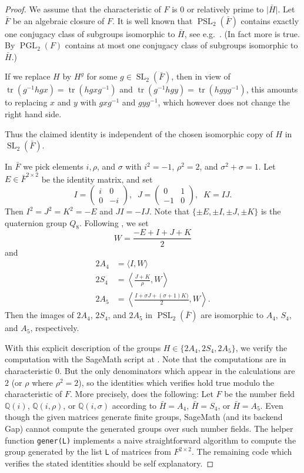 \documentclass[12pt]{amsart}
\theoremstyle{plain}
\theoremstyle{definition}
\numberwithin{equation}{section}
\newcommand{\gen}[1]{\langle#1\rangle}
\newcommand{\biggen}[1]{\left\langle#1\right\rangle}
\newcommand{\abs}[1]{\lvert#1\rvert}
\newcommand*{\set}[1]{\{#1\}}
\newcommand{\QQ}{\mathbb Q}
\newcommand{\bH}{\bar{H}}
\DeclareMathOperator{\PGL}{PGL}
\DeclareMathOperator{\PSL}{PSL}
\DeclareMathOperator{\SL}{SL}
\DeclareMathOperator{\trace}{tr}
\begin{document}
\begin{proof}
  We assume that the characteristic of $F$ is $0$ or relatively prime
  to $\abs{\bH}$. Let $\bar F$ be an algebraic closure of $F$. It is
  well known that $\PSL_2(\bar F)$ contains exactly one conjugacy
  class of subgroups isomorphic to $\bH$, see e.g.~\cite[Proposition
  4.1]{beauville___pgl2}. (In fact more is true. By \cite[Proposition
  4.2]{beauville___pgl2} $\PGL_2(F)$ contains at most one conjugacy
  class of subgroups isomorphic to $\bH$.)

  If we replace $H$ by $H^g$ for some $g\in\SL_2(\bar F)$, then
  in view of $\trace(g^{-1}hgx)=\trace(hgxg^{-1})$ and
  $\trace(g^{-1}hgy)=\trace(hgyg^{-1})$, this amounts to replacing $x$
  and $y$ with $gxg^{-1}$ and $gyg^{-1}$, which however does not
  change the right hand side.

  Thus the claimed identity is independent of the chosen isomorphic
  copy of $H$ in $\SL_2(\bar F)$.

  In $\bar F$ we pick elements $i, \rho$, and $\sigma$ with $i^2=-1$,
  $\rho^2=2$, and $\sigma^2+\sigma=1$. Let $E\in\bar F^{2\times2}$ be
  the identity matrix, and set
  \[ I = \begin{pmatrix}i & 0\\0 & -i\end{pmatrix},\;\;%
    J = \begin{pmatrix}0 & 1\\-1 & 0\end{pmatrix},\;\;%
    K = IJ.
\]
Then $I^2=J^2=K^2=-E$ and $JI=-IJ$. Note that
$\set{\pm E, \pm I, \pm J, \pm K}$ is the quaternion group
$Q_8$. Following \cite{conway_smith}, we set
\[
  W = \frac{-E+I+J+K}{2}
\]
and
\begin{align*}
  2A_4 &= \gen{I, W}\\
  2S_4 &= \biggen{\frac{J + K}{\rho}, W}\\
         2A_5 &= \biggen{\frac{I + \sigma J + (\sigma+1)K)}{2}, W}.
\end{align*}
Then the images of $2A_4$, $2S_4$, and $2A_5$ in $\PSL_2(\bar F)$ are
isomorphic to $A_4$, $S_4$, and $A_5$, respectively.

With this explicit description of the groups
$H\in\set{2A_4, 2S_4, 2A_5}$, we verify the computation with the
SageMath script at \cite{dera_psl2_verify}. Note that the computations
are in characteristic $0$. But the only denominators which appear in
the calculations are $2$ (or $\rho$ where $\rho^2=2$), so the
identities which \cite{dera_psl2_verify} verifies hold true modulo the
characteristic of $F$. More precisely, \cite{dera_psl2_verify} does
the following: Let $F$ be the number field $\QQ(i)$, $\QQ(i, \rho)$,
or $\QQ(i, \sigma)$ according to $\bH=A_4$, $\bH=S_4$, or
$\bH=A_5$. Even though the given matrices generate finite groups,
SageMath (and its backend Gap) cannot compute the generated groups
over such number fields. The helper function \texttt{gener(L)}
implements a naive straightforward algorithm to compute the group
generated by the list \texttt{L} of matrices from $F^{2\times 2}$. The
remaining code which verifies the stated identities should be self
explanatory.
\end{proof}
\end{document}
